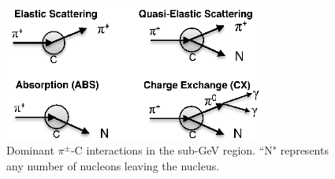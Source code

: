 
\begin{figure}[ht]
\includegraphics[width=86mm]{figures/Figure1_sep_paper_b_w_carbon.eps}
\caption{Dominant $\pi^{\pm}$-{\color{red}C} interactions in the sub-GeV region. ``N" represents any number of nucleons leaving the nucleus.}
\label{fig:interactions}
\end{figure}


